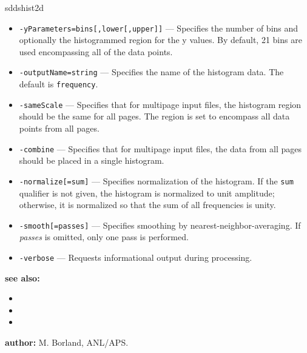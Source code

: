 \begin{sddsprog}{sddshist2d}
\begin{itemize}
      \item \verb|-yParameters=bins[,lower[,upper]]| --- Specifies the number of bins and optionally the histogrammed region
        for the y values. By default, 21 bins are used encompassing all of the data points.
      \item \verb|-outputName=string| --- Specifies the name of the histogram data. The default is \verb|frequency|.
      \item \verb|-sameScale| --- Specifies that for multipage input files, the histogram region should be the same for all pages.
        The region is set to encompass all data points from all pages.
      \item \verb|-combine| --- Specifies that for multipage input files, the data from all pages should be placed in a single histogram.
      \item \verb|-normalize[=sum]| --- Specifies normalization of the histogram. If the \verb|sum| qualifier is not given,
        the histogram is normalized to unit amplitude; otherwise, it is normalized so that the sum of all frequencies is unity.
      \item \verb|-smooth[=passes]| --- Specifies smoothing by nearest-neighbor-averaging. If {\em passes} is omitted, only one pass is performed.
      \item \verb|-verbose| --- Requests informational output during processing.
    \end{itemize}
  \item {\bf see also:}
    \begin{itemize}
      \item {}
      \item {}
      \item {}
    \end{itemize}
  \item {\bf author:} M. Borland, ANL/APS.
\end{sddsprog}

